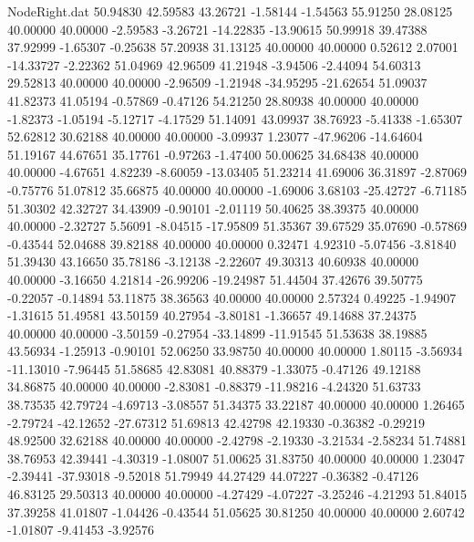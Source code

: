 \begin{filecontents}{NodeRight.dat}
  50.94830   42.59583   43.26721    -1.58144   -1.54563   55.91250   28.08125   40.00000   40.00000   -2.59583   -3.26721  -14.22835  -13.90615
  50.99918   39.47388   37.92999    -1.65307   -0.25638   57.20938   31.13125   40.00000   40.00000    0.52612    2.07001  -14.33727   -2.22362
  51.04969   42.96509   41.21948    -3.94506   -2.44094   54.60313   29.52813   40.00000   40.00000   -2.96509   -1.21948  -34.95295  -21.62654
  51.09037   41.82373   41.05194    -0.57869   -0.47126   54.21250   28.80938   40.00000   40.00000   -1.82373   -1.05194   -5.12717   -4.17529
  51.14091   43.09937   38.76923    -5.41338   -1.65307   52.62812   30.62188   40.00000   40.00000   -3.09937    1.23077  -47.96206  -14.64604
  51.19167   44.67651   35.17761    -0.97263   -1.47400   50.00625   34.68438   40.00000   40.00000   -4.67651    4.82239   -8.60059  -13.03405
  51.23214   41.69006   36.31897    -2.87069   -0.75776   51.07812   35.66875   40.00000   40.00000   -1.69006    3.68103  -25.42727   -6.71185
  51.30302   42.32727   34.43909    -0.90101   -2.01119   50.40625   38.39375   40.00000   40.00000   -2.32727    5.56091   -8.04515  -17.95809
  51.35367   39.67529   35.07690    -0.57869   -0.43544   52.04688   39.82188   40.00000   40.00000    0.32471    4.92310   -5.07456   -3.81840
  51.39430   43.16650   35.78186    -3.12138   -2.22607   49.30313   40.60938   40.00000   40.00000   -3.16650    4.21814  -26.99206  -19.24987
  51.44504   37.42676   39.50775    -0.22057   -0.14894   53.11875   38.36563   40.00000   40.00000    2.57324    0.49225   -1.94907   -1.31615
  51.49581   43.50159   40.27954    -3.80181   -1.36657   49.14688   37.24375   40.00000   40.00000   -3.50159   -0.27954  -33.14899  -11.91545
  51.53638   38.19885   43.56934    -1.25913   -0.90101   52.06250   33.98750   40.00000   40.00000    1.80115   -3.56934  -11.13010   -7.96445
  51.58685   42.83081   40.88379    -1.33075   -0.47126   49.12188   34.86875   40.00000   40.00000   -2.83081   -0.88379  -11.98216   -4.24320
  51.63733   38.73535   42.79724    -4.69713   -3.08557   51.34375   33.22187   40.00000   40.00000    1.26465   -2.79724  -42.12652  -27.67312
  51.69813   42.42798   42.19330    -0.36382   -0.29219   48.92500   32.62188   40.00000   40.00000   -2.42798   -2.19330   -3.21534   -2.58234
  51.74881   38.76953   42.39441    -4.30319   -1.08007   51.00625   31.83750   40.00000   40.00000    1.23047   -2.39441  -37.93018   -9.52018
  51.79949   44.27429   44.07227    -0.36382   -0.47126   46.83125   29.50313   40.00000   40.00000   -4.27429   -4.07227   -3.25246   -4.21293
  51.84015   37.39258   41.01807    -1.04426   -0.43544   51.05625   30.81250   40.00000   40.00000    2.60742   -1.01807   -9.41453   -3.92576

\end{filecontents}
